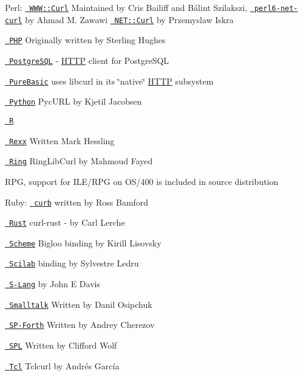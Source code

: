 Perl\+: \href{https://github.com/szbalint/WWW--Curl}{\texttt{ WWW\+::\+Curl}} Maintained by Cris Bailiff and Bálint Szilakszi, \href{https://github.com/azawawi/perl6-net-curl}{\texttt{ perl6-\/net-\/curl}} by Ahmad M. Zawawi \href{https://metacpan.org/pod/Net::Curl}{\texttt{ NET\+::\+Curl}} by Przemyslaw Iskra

\href{https://php.net/curl}{\texttt{ PHP}} Originally written by Sterling Hughes

\href{https://github.com/pramsey/pgsql-http}{\texttt{ Postgre\+SQL}} -\/ \mbox{\hyperlink{struct_h_t_t_p}{HTTP}} client for Postgre\+SQL

\href{https://www.purebasic.com/documentation/http/index.html}{\texttt{ Pure\+Basic}} uses libcurl in its \char`\"{}native\char`\"{} \mbox{\hyperlink{struct_h_t_t_p}{HTTP}} subsystem

\href{http://pycurl.io/}{\texttt{ Python}} Pyc\+URL by Kjetil Jacobsen

\href{https://cran.r-project.org/package=curl}{\texttt{ R}}

\href{https://rexxcurl.sourceforge.io/}{\texttt{ Rexx}} Written Mark Hessling

\href{https://ring-lang.sourceforge.io/doc1.3/libcurl.html}{\texttt{ Ring}} Ring\+Lib\+Curl by Mahmoud Fayed

RPG, support for ILE/\+RPG on OS/400 is included in source distribution

Ruby\+: \href{https://github.com/taf2/curb}{\texttt{ curb}} written by Ross Bamford

\href{https://github.com/carllerche/curl-rust}{\texttt{ Rust}} curl-\/rust -\/ by Carl Lerche

\href{http://www.metapaper.net/lisovsky/web/curl/}{\texttt{ Scheme}} Bigloo binding by Kirill Lisovsky

\href{https://help.scilab.org/docs/current/fr_FR/getURL.html}{\texttt{ Scilab}} binding by Sylvestre Ledru

\href{https://www.jedsoft.org/slang/modules/curl.html}{\texttt{ S-\/\+Lang}} by John E Davis

\href{https://www.squeaksource.com/CurlPlugin/}{\texttt{ Smalltalk}} Written by Danil Osipchuk

\href{https://sourceforge.net/p/spf/spf/ci/master/tree/devel/~ac/lib/lin/curl/}{\texttt{ SP-\/\+Forth}} Written by Andrey Cherezov

\href{http://www.clifford.at/spl/}{\texttt{ SPL}} Written by Clifford Wolf

\href{https://web.archive.org/web/20160826011806/mirror.yellow5.com/tclcurl/}{\texttt{ Tcl}} Tclcurl by Andrés García

